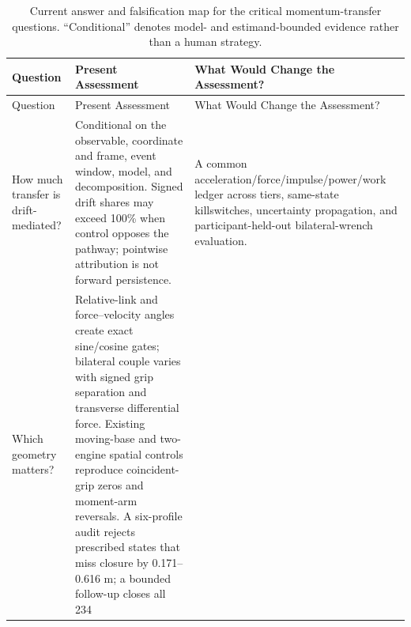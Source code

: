\documentclass[
  letterpaper,
]{report}
\begin{document}
\begin{longtable}[]{@{}
  >{\raggedright\arraybackslash}p{}
  >{\raggedright\arraybackslash}p{}
  >{\raggedright\arraybackslash}p{}@{}}
\caption{Current answer and falsification map for the critical
momentum-transfer questions. ``Conditional'' denotes model- and
estimand-bounded evidence rather than a human
strategy.}\label{tbl-momentum-question-status}\tabularnewline
\toprule\noalign{}
\begin{minipage}[b]{\linewidth}\raggedright
Question
\end{minipage} & \begin{minipage}[b]{\linewidth}\raggedright
Present Assessment
\end{minipage} & \begin{minipage}[b]{\linewidth}\raggedright
What Would Change the Assessment?
\end{minipage} \\
\midrule\noalign{}
\endfirsthead
\toprule\noalign{}
\begin{minipage}[b]{\linewidth}\raggedright
Question
\end{minipage} & \begin{minipage}[b]{\linewidth}\raggedright
Present Assessment
\end{minipage} & \begin{minipage}[b]{\linewidth}\raggedright
What Would Change the Assessment?
\end{minipage} \\
\midrule\noalign{}
\endhead
\bottomrule\noalign{}
\endlastfoot
How much transfer is drift-mediated? & Conditional on the observable,
coordinate and frame, event window, model, and decomposition. Signed
drift shares may exceed 100\% when control opposes the pathway;
pointwise attribution is not forward persistence. & A common
acceleration/force/impulse/power/work ledger across tiers, same-state
killswitches, uncertainty propagation, and participant-held-out
bilateral-wrench evaluation. \\
Which geometry matters? & Relative-link and force--velocity angles
create exact sine/cosine gates; bilateral couple varies with signed grip
separation and transverse differential force. Existing moving-base and
two-engine spatial controls reproduce coincident-grip zeros and
moment-arm reversals. A six-profile audit rejects prescribed states that
miss closure by 0.171--0.616 m; a bounded follow-up closes all 234

\end{longtable}
\end{document}
